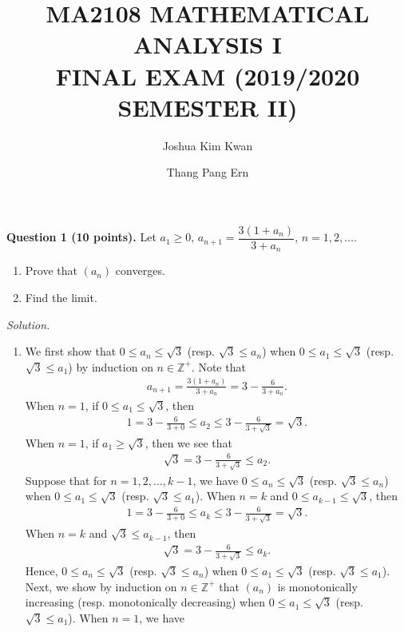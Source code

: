 \documentclass[11pt]{amsart}
\title {MA2108 MATHEMATICAL ANALYSIS I\\ FINAL EXAM (2019/2020 SEMESTER II)}
\author{Joshua Kim Kwan}
\author{Thang Pang Ern}
\theoremstyle{plain}
\numberwithin{equation}{section}
\begin{document}
\maketitle
\noindent

\textbf{Question 1 (10 points).} Let $a_{1}\geq 0$, $a_{n+1}=\dfrac{3\left(1+a_{n}\right)}{3+a_{n}}$, $n=1,2,\dots$. 
\vskip 5pt
\begin{enumerate}[label=\textbf{(\roman*)}]
    \itemsep 0em
    \item Prove that $\left(a_{n}\right)$ converges. 
    \item Find the limit. 
\end{enumerate}
\noindent\emph{Solution.}
\begin{enumerate}[label=\textbf{(\roman*)}]
    \itemsep 0em
    \item We first show that $0\leq a_{n}\leq\sqrt{3}$ (resp. $\sqrt{3}\leq a_{n}$) when $0\leq a_{1}\leq\sqrt{3}$ (resp. $\sqrt{3}\leq a_{1}$) by induction on $n\in\mathbb{Z}^{+}$. Note that
\begin{align*}
    a_{n+1}=\frac{3\left(1+a_{n}\right)}{3+a_{n}}=3-\frac{6}{3+a_{n}}.
\end{align*}
When $n=1$, if $0\leq a_{1}\leq\sqrt{3}$, then
\begin{align*}
    1=3-\frac{6}{3+0}\leq a_{2}\leq3-\frac{6}{3+\sqrt{3}}=\sqrt{3}.
\end{align*}
When $n=1$, if $a_{1}\geq\sqrt{3}$, then we see that
\begin{align*}
    \sqrt{3}=3-\frac{6}{3+\sqrt{3}}\leq a_{2}.
\end{align*}
Suppose that for $n=1,2,\dots,k-1$, we have $0\leq a_{n}\leq\sqrt{3}$ (resp. $\sqrt{3}\leq a_{n}$) when $0\leq a_{1}\leq\sqrt{3}$ (resp. $\sqrt{3}\leq a_{1}$). When $n=k$ and $0\leq a_{k-1}\leq\sqrt{3}$, then
\begin{align*}
    1=3-\frac{6}{3+0}\leq a_{k}\leq3-\frac{6}{3+\sqrt{3}}=\sqrt{3}.
\end{align*}
When $n=k$ and $\sqrt{3}\leq a_{k-1}$, then
\begin{align*}
    \sqrt{3}=3-\frac{6}{3+\sqrt{3}}\leq a_{k}.
\end{align*}
Hence, $0\leq a_{n}\leq\sqrt{3}$ (resp. $\sqrt{3}\leq a_{n}$) when $0\leq a_{1}\leq\sqrt{3}$ (resp. $\sqrt{3}\leq a_{1}$).
\newline
\newline Next, we show by induction on $n\in\mathbb{Z}^{+}$ that $\left(a_{n}\right)$ is monotonically increasing (resp. monotonically decreasing) when $0\leq a_{1}\leq\sqrt{3}$ (resp. $\sqrt{3}\leq a_{1}$). When $n=1$, we have

\end{enumerate}
\end{document}
